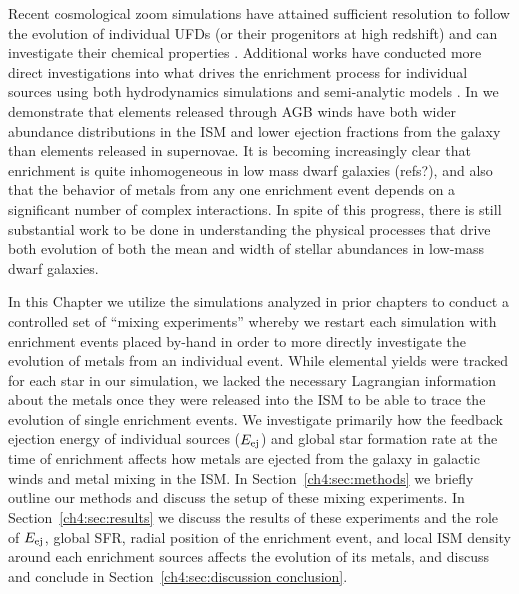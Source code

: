 
Recent cosmological zoom simulations have attained sufficient resolution to follow the evolution of individual UFDs (or their progenitors at high redshift) and can investigate their chemical properties \citep{Jeon2017,Corlies2018,Escala2018,Christensen2018}. Additional works have conducted more direct investigations into what drives the enrichment process for individual sources using both hydrodynamics simulations \citep{PanScannapiecoScalo2013,Ritter2015,Safarzadeh2017,Hirai2015,Hirai2017,Emerick2018b,HaynesKobayashi2019} and semi-analytic models \citep{Beniamini2018,KrumholzTing2018}. In \cite{Emerick2018b} we demonstrate that elements released through AGB winds have both wider abundance distributions in the ISM and lower ejection fractions from the galaxy than elements released in supernovae. It is becoming increasingly clear that enrichment is quite inhomogeneous in low mass dwarf galaxies (refs?), and also that the behavior of metals from any one enrichment event depends on a significant number of complex interactions. In spite of this progress, there is still substantial work to be done in understanding the physical processes that drive both evolution of both the mean and width of stellar abundances in low-mass dwarf galaxies.

In this Chapter we utilize the simulations analyzed in prior chapters to conduct a controlled set of ``mixing experiments'' whereby we restart each simulation with enrichment events placed by-hand in order to more directly investigate the evolution of metals from an individual event. While elemental yields were tracked for each star in our simulation, we lacked the necessary Lagrangian information about the metals once they were released into the ISM to be able to trace the evolution of single enrichment events. We investigate primarily how the feedback ejection energy of individual sources ($E_{\rm ej}$) and global star formation rate at the time of enrichment affects how metals are ejected from the galaxy in galactic winds and metal mixing in the ISM. In Section~\ref{ch4:sec:methods} we briefly outline our methods and discuss the setup of these mixing experiments. In Section~\ref{ch4:sec:results} we discuss the results of these experiments and the role of $E_{\rm ej}$, global SFR, radial position of the enrichment event, and local ISM density around each enrichment sources affects the evolution of its metals, and discuss and conclude in Section~\ref{ch4:sec:discussion conclusion}.


